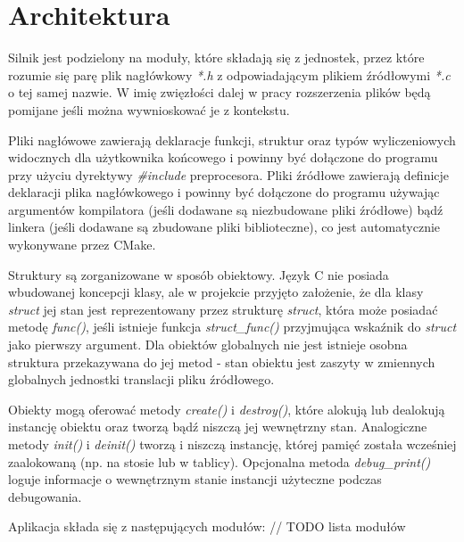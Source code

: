 \section{Architektura}

Silnik jest podzielony na moduły, które składają się z jednostek, przez które rozumie się parę plik nagłówkowy \textit{*.h} z odpowiadającym plikiem źródłowymi \textit{*.c} o tej samej nazwie.
W imię zwięzłości dalej w pracy rozszerzenia plików będą pomijane jeśli można wywnioskować je z kontekstu.

Pliki nagłówowe zawierają deklaracje funkcji, struktur oraz typów wyliczeniowych widocznych dla użytkownika końcowego i powinny być dołączone do programu przy użyciu dyrektywy \textit{\#include} preprocesora.
Pliki źródłowe zawierają definicje deklaracji plika nagłówkowego i powinny być dołączone do programu używając argumentów kompilatora (jeśli dodawane są niezbudowane pliki źródłowe) bądź linkera (jeśli dodawane są zbudowane pliki biblioteczne), co jest automatycznie wykonywane przez CMake.

Struktury są zorganizowane w sposób obiektowy.
Język C nie posiada wbudowanej koncepcji klasy, ale w projekcie przyjęto założenie, że dla klasy \textit{struct} jej stan jest reprezentowany przez strukturę \textit{struct}, która może posiadać metodę \textit{func()}, jeśli istnieje funkcja \textit{struct\_func()} przyjmująca wskaźnik do \textit{struct} jako pierwszy argument.
Dla obiektów globalnych nie jest istnieje osobna struktura przekazywana do jej metod - stan obiektu jest zaszyty w zmiennych globalnych jednostki translacji pliku źródłowego.

Obiekty mogą oferować metody \textit{create()} i \textit{destroy()}, które alokują lub dealokują instancję obiektu oraz tworzą bądź niszczą jej wewnętrzny stan.
Analogiczne metody \textit{init()} i \textit{deinit()} tworzą i niszczą instancję, której pamięć została wcześniej zaalokowaną (np. na stosie lub w tablicy).
Opcjonalna metoda \textit{debug\_print()} loguje informacje o wewnętrznym stanie instancji użyteczne podczas debugowania.


Aplikacja składa się z następujących modułów:
// TODO lista modułów

